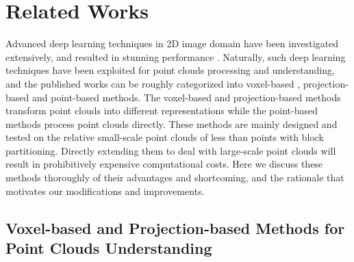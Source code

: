 \documentclass[journal]{IEEEtran}
\begin{document}
\section{Related Works}
Advanced deep learning techniques in 2D image domain have been investigated extensively, and resulted in stunning performance \cite{yang2020hierarchical, yan2020new, kim2019keyboard,chen2020deep,liu2019weakly}. Naturally, such deep learning techniques have been exploited for point clouds processing and understanding, and the published works can be roughly categorized into voxel-based
\cite{graham20183d,choy20194d,tang2020searching, meng2019vv,ye2020hvnet}, projection-based\cite{milioto2019rangenet++,wu2019squeezesegv2,xu2020squeezesegv3,feng2018gvcnn,kundu2020virtual,li2020end,gojcic2020learning} and point-based methods\cite{landrieu2019point,wang2019re,nezhadarya2020adaptive,zhang2019shellnet, qi2017pointnet++,yan2020pointasnl,liu2019densepoint,qi2017pointnet,shen2018mining,thomas2019kpconv,lei2020spherical, liu2019point, wu2019pointconv}. The voxel-based and projection-based methods transform point clouds into different representations while the point-based methods process point clouds directly. These methods are mainly designed and tested on the relative small-scale point clouds of less than  points with block partitioning. Directly extending them to deal with large-scale point clouds will result in prohibitively expensive computational costs. Here we discuss these methods thoroughly of their advantages and shortcoming, and the rationale that motivates our modifications and improvements. 





\subsection{Voxel-based and Projection-based Methods for Point Clouds Understanding}
\end{document}
